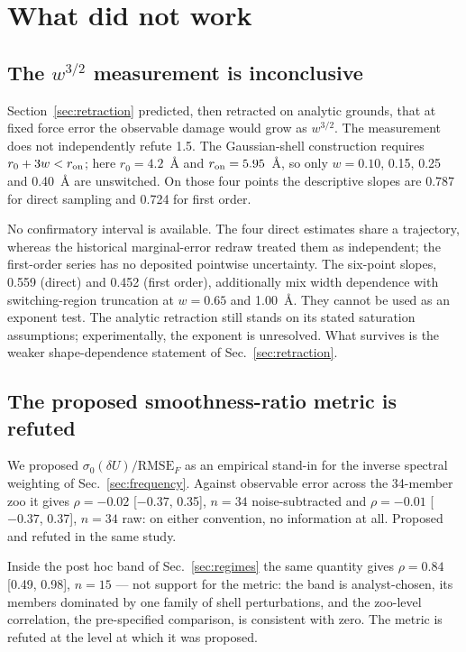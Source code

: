 \documentclass[aip,jcp,reprint,amsmath,amssymb,floatfix]{revtex4-2}
\newcommand{\dU}{\ensuremath{\delta U}}
\begin{document}
\section{What did not work}
\label{sec:failures}

\subsection{The \texorpdfstring{$w^{3/2}$}{w3/2} measurement is inconclusive}
\label{sec:w32}

Section~\ref{sec:retraction} predicted, then retracted on analytic grounds,
that at fixed force error the observable damage would grow as $w^{3/2}$. The
measurement does not independently refute 1.5. The Gaussian-shell construction
requires $r_0+3w<r_{\rm on}$; here $r_0=4.2$~\AA{} and
$r_{\rm on}=5.95$~\AA{}, so only $w=0.10$, 0.15, 0.25 and 0.40~\AA{}
are unswitched. On those four points the descriptive slopes are 0.787 for
direct sampling and 0.724 for first order.

No confirmatory interval is available. The four direct estimates share a
trajectory, whereas the historical marginal-error redraw treated them as
independent; the first-order series has no deposited pointwise uncertainty.
The six-point slopes, 0.559 (direct) and 0.452 (first order), additionally mix
width dependence with switching-region truncation at $w=0.65$ and 1.00~\AA{}.
They cannot be used as an exponent test. The analytic retraction still stands
on its stated saturation assumptions; experimentally, the exponent is
unresolved. What survives is the weaker shape-dependence statement of
Sec.~\ref{sec:retraction}.

\subsection{The proposed smoothness-ratio metric is refuted}
\label{sec:smoothness}

We proposed $\sigma_0(\dU)/\mathrm{RMSE}_F$ as an empirical stand-in for the
inverse spectral weighting of Sec.~\ref{sec:frequency}. Against
observable error across the 34-member zoo it gives $\rho = -0.02$ [$-0.37$,
0.35], $n = 34$ noise-subtracted and $\rho = -0.01$ [$-0.37$,
0.37], $n = 34$ raw: on either convention, no
information at all. Proposed and refuted in the same study.

Inside the post hoc band of
Sec.~\ref{sec:regimes} the same quantity gives $\rho = 0.84$ [0.49, 0.98],
$n = 15$ --- not support for the metric: the band is analyst-chosen, its members
dominated by one family of shell perturbations,
and the zoo-level correlation, the pre-specified comparison, is consistent
with zero. The metric is refuted at the level at which it was proposed.
\end{document}
